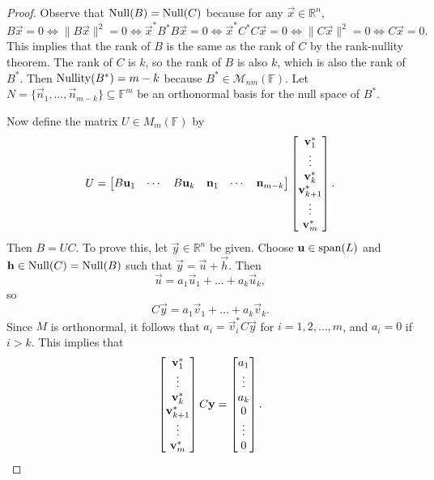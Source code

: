 \documentclass{homework}
\begin{document}
\begin{proof}
		Observe that $\mathrm{Null}(B) = \mathrm{Null}(C)$ because for any $\vec{x} \in \mathbb{R}^n$,
		\begin{equation*}
			B\vec{x} = 0 \iff \lVert B\vec{x}\rVert^2 = 0 \iff \vec{x}^*B^*B\vec{x} = 0 \iff \vec{x}^*C^*C\vec{x} = 0 \iff \lVert C\vec{x}\rVert^2 = 0 \iff C\vec{x} = 0.
		\end{equation*}
		This implies that the rank of $B$ is the same as the rank of $C$ by the rank-nullity theorem. The rank of $C$ is $k$, so the rank of $B$ is also $k$, which is also the rank of $B^*$. Then $\mathrm{Nullity}(B^*) = m - k$ because $B^* \in \mathcal{M}_{nm}(\mathbb{F})$. Let $N = \{\vec{n}_1, \dots, \vec{n}_{m-k}\} \subseteq \mathbb{F}^m$ be an orthonormal basis for the null space of $B^*$.
		
		Now define the matrix $U \in M_m(\mathbb{F})$ by
		\begin{equation*}
			U = \left[\begin{matrix}B\mathbf{u}_1 & \cdots & B\mathbf{u}_k & \mathbf{n}_1 & \cdots & \mathbf{n}_{m-k}\end{matrix}\right]
			\left[\begin{matrix}\mathbf{v}_1^*\\ \vdots \\ \mathbf{v}_k^* \\\mathbf{v}_{k+1}^* \\ \vdots \\ \mathbf{v}_m^*\end{matrix}\right].
		\end{equation*}
		Then $B = UC$. To prove this, let $\vec{y} \in \mathbb{R}^n$ be given. Choose $\mathbf{u} \in \mathrm{span}(L)$ and $\mathbf{h} \in \mathrm{Null}(C)= \mathrm{Null}(B)$ such that $\vec{y} = \vec{u} + \vec{h}$. Then
		\begin{equation*}
			\vec{u} = a_1 \vec{u}_1 + \dots + a_k \vec{u}_k,
		\end{equation*}
		so
		\begin{equation*}
			C\vec{y} = a_1\vec{v}_1 + \dots + a_k \vec{v}_k.
		\end{equation*}
		Since $M$ is orthonormal, it follows that $a_i = \vec{v}_i^*C\vec{y}$ for $i = 1,2,\dots, m$, and $a_i = 0$ if $i > k$. This implies that
		\begin{equation*}
			\mat{\vec{v}_1^*\\ \vdots \\ \vec{v}_k^* \\\vec{v}_{k+1}^* \\ \vdots \\ \vec{v}_m^*}C\vec{y} = \mat{a_1 \\ \vdots \\ a_k \\ 0 \\ \vdots \\ 0}.

\end{equation*}
\end{proof}
\end{document}
